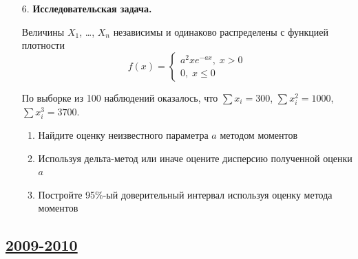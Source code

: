 \begin{enumerate}
\item[6.] \textbf{Исследовательская задача.}

Величины $X_1$, \ldots, $X_n$ независимы и одинаково распределены с функцией плотности
\[
f(x)=\begin{cases}
a^2xe^{-ax}, \; x>0 \\
0, \; x\leq 0
\end{cases}
\]

По выборке из 100 наблюдений оказалось, что $\sum x_i =300$, $\sum x_i^2=1000$,
$\sum x_i^3=3700$.

\begin{enumerate}
\item Найдите оценку неизвестного параметра $a$ методом моментов
\item Используя дельта-метод или иначе оцените дисперсию полученной оценки $a$
\item Постройте 95\%-ый доверительный интервал используя оценку метода моментов
\end{enumerate}
\end{enumerate}



\subsection[2009-2010]{\hyperref[sec:sol_kr_04_2009_2010]{2009-2010}}
\label{sec:kr_04_2009_2010}



